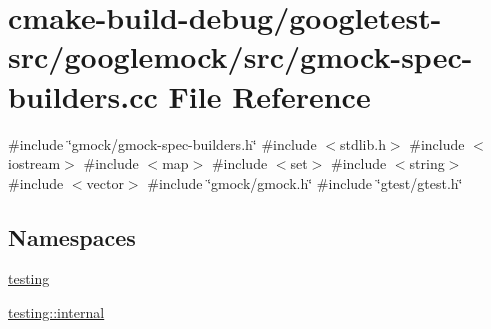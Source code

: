 \hypertarget{gmock-spec-builders_8cc}{}\section{cmake-\/build-\/debug/googletest-\/src/googlemock/src/gmock-\/spec-\/builders.cc File Reference}
\label{gmock-spec-builders_8cc}
{\ttfamily \#include \char`\"{}gmock/gmock-\/spec-\/builders.\+h\char`\"{}}\newline
{\ttfamily \#include $<$stdlib.\+h$>$}\newline
{\ttfamily \#include $<$iostream$>$}\newline
{\ttfamily \#include $<$map$>$}\newline
{\ttfamily \#include $<$set$>$}\newline
{\ttfamily \#include $<$string$>$}\newline
{\ttfamily \#include $<$vector$>$}\newline
{\ttfamily \#include \char`\"{}gmock/gmock.\+h\char`\"{}}\newline
{\ttfamily \#include \char`\"{}gtest/gtest.\+h\char`\"{}}\newline
\subsection*{Namespaces}
\begin{DoxyCompactItemize}
\item 
 \mbox{\hyperlink{namespacetesting}{testing}}
\item 
 \mbox{\hyperlink{namespacetesting_1_1internal}{testing\+::internal}}
\end{DoxyCompactItemize}
